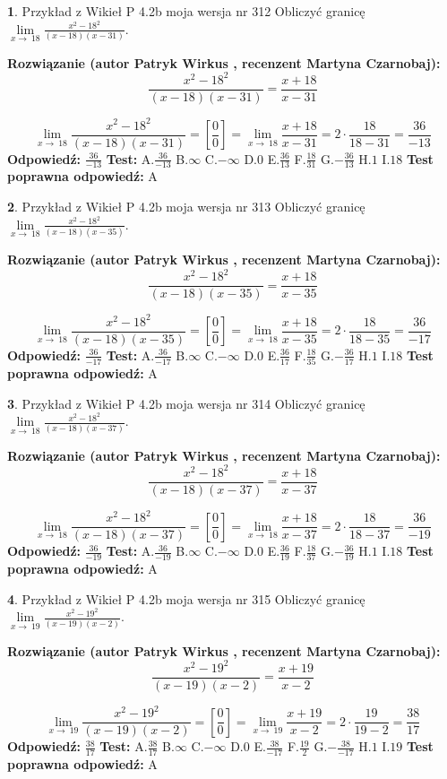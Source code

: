 \documentclass[12pt, a4paper]{article}
\theoremstyle{definition} %
\newtheorem{zad}{}
\newcommand{\zadStart}[1]{\begin{zad}#1\newline}
\newcommand{\zadStop}{\end{zad}}
\newcommand{\rozwStart}[2]{\noindent \textbf{Rozwiązanie (autor #1 , recenzent #2): }\newline}
\newcommand{\rozwStop}{\newline}
\newcommand{\odpStart}{\noindent \textbf{Odpowiedź:}\newline}
\newcommand{\odpStop}{\newline}
\newcommand{\testStart}{\noindent \textbf{Test:}\newline}
\newcommand{\testStop}{\newline}
\newcommand{\kluczStart}{\noindent \textbf{Test poprawna odpowiedź:}\newline}
\newcommand{\kluczStop}{\newline}
\begin{document}
\zadStart{Przykład z Wikieł P 4.2b moja wersja nr 312}
Obliczyć granicę $\lim\limits_{x\to\ 18}\frac{x^{2}-18^{2}}{(x-18)(x-31)}$.
\zadStop
\rozwStart{Patryk Wirkus}{Martyna Czarnobaj}
$$\frac{x^{2}-18^{2}}{(x-18)(x-31)}=\frac{x+18}{x-31}$$

$$\lim\limits_{x\to\ 18}\frac{x^{2}-18^{2}}{(x-18)(x-31)}=[\frac{0}{0}]=\lim\limits_{x\to\ 18}\frac{x+18}{x-31}=2 \cdot \frac{18}{18-31} = \frac{36}{-13}$$
\rozwStop
\odpStart
$\frac{36}{-13}$
\odpStop
\testStart
A.$\frac{36}{-13}$
B.$\infty$
C.$-\infty$
D.$0$
E.$\frac{36}{13}$
F.$\frac{18}{31}$
G.$-\frac{36}{13}$
H.$1$
I.$18$
\testStop
\kluczStart
A
\kluczStop



\zadStart{Przykład z Wikieł P 4.2b moja wersja nr 313}
Obliczyć granicę $\lim\limits_{x\to\ 18}\frac{x^{2}-18^{2}}{(x-18)(x-35)}$.
\zadStop
\rozwStart{Patryk Wirkus}{Martyna Czarnobaj}
$$\frac{x^{2}-18^{2}}{(x-18)(x-35)}=\frac{x+18}{x-35}$$

$$\lim\limits_{x\to\ 18}\frac{x^{2}-18^{2}}{(x-18)(x-35)}=[\frac{0}{0}]=\lim\limits_{x\to\ 18}\frac{x+18}{x-35}=2 \cdot \frac{18}{18-35} = \frac{36}{-17}$$
\rozwStop
\odpStart
$\frac{36}{-17}$
\odpStop
\testStart
A.$\frac{36}{-17}$
B.$\infty$
C.$-\infty$
D.$0$
E.$\frac{36}{17}$
F.$\frac{18}{35}$
G.$-\frac{36}{17}$
H.$1$
I.$18$
\testStop
\kluczStart
A
\kluczStop



\zadStart{Przykład z Wikieł P 4.2b moja wersja nr 314}
Obliczyć granicę $\lim\limits_{x\to\ 18}\frac{x^{2}-18^{2}}{(x-18)(x-37)}$.
\zadStop
\rozwStart{Patryk Wirkus}{Martyna Czarnobaj}
$$\frac{x^{2}-18^{2}}{(x-18)(x-37)}=\frac{x+18}{x-37}$$

$$\lim\limits_{x\to\ 18}\frac{x^{2}-18^{2}}{(x-18)(x-37)}=[\frac{0}{0}]=\lim\limits_{x\to\ 18}\frac{x+18}{x-37}=2 \cdot \frac{18}{18-37} = \frac{36}{-19}$$
\rozwStop
\odpStart
$\frac{36}{-19}$
\odpStop
\testStart
A.$\frac{36}{-19}$
B.$\infty$
C.$-\infty$
D.$0$
E.$\frac{36}{19}$
F.$\frac{18}{37}$
G.$-\frac{36}{19}$
H.$1$
I.$18$
\testStop
\kluczStart
A
\kluczStop



\zadStart{Przykład z Wikieł P 4.2b moja wersja nr 315}
Obliczyć granicę $\lim\limits_{x\to\ 19}\frac{x^{2}-19^{2}}{(x-19)(x-2)}$.
\zadStop
\rozwStart{Patryk Wirkus}{Martyna Czarnobaj}
$$\frac{x^{2}-19^{2}}{(x-19)(x-2)}=\frac{x+19}{x-2}$$

$$\lim\limits_{x\to\ 19}\frac{x^{2}-19^{2}}{(x-19)(x-2)}=[\frac{0}{0}]=\lim\limits_{x\to\ 19}\frac{x+19}{x-2}=2 \cdot \frac{19}{19-2} = \frac{38}{17}$$
\rozwStop
\odpStart
$\frac{38}{17}$
\odpStop
\testStart
A.$\frac{38}{17}$
B.$\infty$
C.$-\infty$
D.$0$
E.$\frac{38}{-17}$
F.$\frac{19}{2}$
G.$-\frac{38}{-17}$
H.$1$
I.$19$
\testStop
\kluczStart
A
\kluczStop
\end{document}
